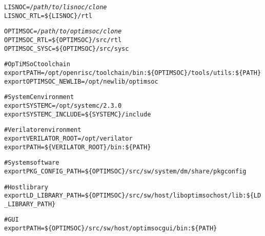 \begin{alltt}
LISNOC=\emph{/path/to/lisnoc/clone}
LISNOC_RTL=\$\{LISNOC\}/rtl

OPTIMSOC=\emph{/path/to/optimsoc/clone}
OPTIMSOC_RTL=\$\{OPTIMSOC\}/src/rtl
OPTIMSOC_SYSC=\$\{OPTIMSOC\}/src/sysc

# OpTiMSoC toolchain
export PATH=/opt/openrisc/toolchain/bin:\$\{OPTIMSOC\}/tools/utils:\$\{PATH\}
export OPTIMSOC_NEWLIB=/opt/newlib/optimsoc

# SystemC environment
export SYSTEMC=/opt/systemc/2.3.0
export SYSTEMC_INCLUDE=\$\{SYSTEMC\}/include

# Verilator environment
export VERILATOR\_ROOT=/opt/verilator
export PATH=\$\{VERILATOR_ROOT\}/bin:\$\{PATH\}

# System software
export PKG_CONFIG_PATH=\$\{OPTIMSOC\}/src/sw/system/dm/share/pkgconfig

# Host library
export LD_LIBRARY_PATH=\$\{OPTIMSOC\}/src/sw/host/liboptimsochost/lib:\$\{LD_LIBRARY_PATH\}

# GUI
export PATH=\$\{OPTIMSOC\}/src/sw/host/optimsocgui/bin:\$\{PATH\}


\end{alltt}